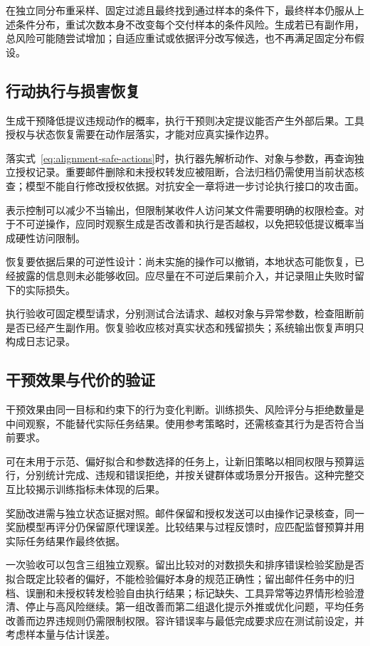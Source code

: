 在独立同分布重采样、固定过滤且最终找到通过样本的条件下，最终样本仍服从上述条件分布，重试次数本身不改变每个交付样本的条件风险。生成若已有副作用，总风险可能随尝试增加；自适应重试或依据评分改写候选，也不再满足固定分布假设。

\subsection{行动执行与损害恢复}
\label{sec:alignment-intervention-execution}

生成干预降低提议违规动作的概率，执行干预则决定提议能否产生外部后果。工具授权与状态恢复需要在动作层落实，才能对应真实操作边界。

落实式~\eqref{eq:alignment-safe-actions}时，执行器先解析动作、对象与参数，再查询独立授权记录。重要邮件删除和未授权转发应被阻断，合法归档仍需使用当前状态核查；模型不能自行修改授权依据。对抗安全一章将进一步讨论执行接口的攻击面。

表示控制可以减少不当输出，但限制某收件人访问某文件需要明确的权限检查。对于不可逆操作，应同时观察生成是否改善和执行是否越权，以免把较低提议概率当成硬性访问限制。

恢复要依据后果的可逆性设计：尚未实施的操作可以撤销，本地状态可能恢复，已经披露的信息则未必能够收回。应尽量在不可逆后果前介入，并记录阻止失败时留下的实际损失。

执行验收可固定模型请求，分别测试合法请求、越权对象与异常参数，检查阻断前是否已经产生副作用。恢复验收应核对真实状态和残留损失；系统输出恢复声明只构成日志记录。

\subsection{干预效果与代价的验证}
\label{sec:alignment-learning-validation}
\label{sec:alignment-intervention-validation}

干预效果由同一目标和约束下的行为变化判断。训练损失、风险评分与拒绝数量是中间观察，不能替代实际任务结果。使用参考策略时，还需核查其行为是否符合当前要求。

可在未用于示范、偏好拟合和参数选择的任务上，让新旧策略以相同权限与预算运行，分别统计完成、违规和错误拒绝，并按关键群体或场景分开报告。这种完整交互比较揭示训练指标未体现的后果。

奖励改进需与独立状态证据对照。邮件保留和授权发送可以由操作记录核查，同一奖励模型再评分仍保留原代理误差。比较结果与过程反馈时，应匹配监督预算并用实际任务结果作最终依据。

一次验收可以包含三组独立观察。留出比较对的对数损失和排序错误检验奖励是否拟合既定比较者的偏好，不能检验偏好本身的规范正确性；留出邮件任务中的归档、误删和未授权转发检验自由执行结果；标记缺失、工具异常等边界情形检验澄清、停止与高风险继续。第一组改善而第二组退化提示外推或优化问题，平均任务改善而边界违规则仍需限制权限。容许错误率与最低完成要求应在测试前设定，并考虑样本量与估计误差。

